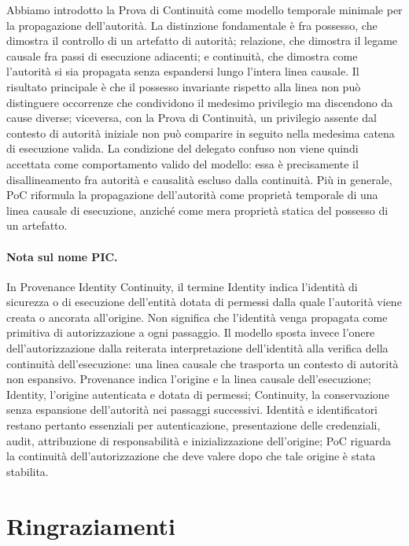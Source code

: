 \documentclass[11pt]{article}
\begin{document}
Abbiamo introdotto la Prova di Continuità come modello temporale minimale per la
propagazione dell'autorità. La distinzione fondamentale è fra possesso, che
dimostra il controllo di un artefatto di autorità; relazione, che dimostra il
legame causale fra passi di esecuzione adiacenti; e continuità, che dimostra come
l'autorità si sia propagata senza espandersi lungo l'intera linea causale. Il
risultato principale è che il possesso invariante rispetto alla linea non può
distinguere occorrenze che condividono il medesimo privilegio ma discendono da
cause diverse; viceversa, con la Prova di Continuità, un privilegio assente dal
contesto di autorità iniziale non può comparire in seguito nella medesima catena
di esecuzione valida. La condizione del delegato confuso non viene quindi
accettata come comportamento valido del modello: essa è precisamente il
disallineamento fra autorità e causalità escluso dalla continuità. Più in
generale, PoC riformula la propagazione dell'autorità come proprietà temporale di
una linea causale di esecuzione, anziché come mera proprietà statica del possesso
di un artefatto.

\paragraph{Nota sul nome PIC.}
In Provenance Identity Continuity, il termine Identity indica l'identità di
sicurezza o di esecuzione dell'entità dotata di permessi dalla quale l'autorità
viene creata o ancorata all'origine. Non significa che l'identità venga
propagata come primitiva di autorizzazione a ogni passaggio. Il modello sposta
invece l'onere dell'autorizzazione dalla reiterata interpretazione dell'identità
alla verifica della continuità dell'esecuzione: una linea causale che trasporta
un contesto di autorità non espansivo. Provenance indica l'origine e la linea
causale dell'esecuzione; Identity, l'origine autenticata e dotata di permessi;
Continuity, la conservazione senza espansione dell'autorità nei passaggi
successivi. Identità e identificatori restano pertanto essenziali per
autenticazione, presentazione delle credenziali, audit, attribuzione di
responsabilità e inizializzazione dell'origine; PoC riguarda la continuità
dell'autorizzazione che deve valere dopo che tale origine è stata stabilita.

\section*{Ringraziamenti}
\end{document}
